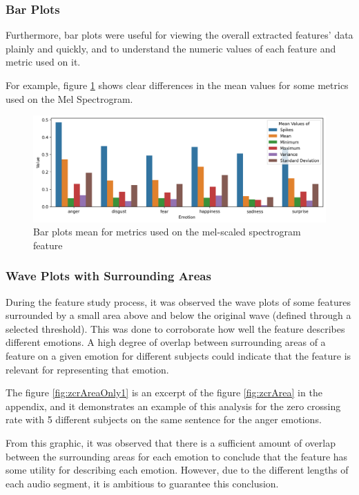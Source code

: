 \subsubsection{Bar Plots}

Furthermore, bar plots were useful for viewing the overall extracted features' data plainly and quickly, and to understand the numeric values of each feature and metric used on it.

For example, figure \ref{fig:melBarPlot} shows clear differences in the mean values for some metrics used on the Mel Spectrogram.

\begin{figure}[H]
	\centering
	\includegraphics[width=\textwidth]{figs/4_1_traditional/meanFeatBarPlot.png}
	\caption{Bar plots mean for metrics used on the mel-scaled spectrogram feature}
	\label{fig:melBarPlot}
\end{figure}


\subsubsection{Wave Plots with Surrounding Areas}

During the feature study process, it was observed the wave plots of some features surrounded by a small area above and below the original wave (defined through a selected threshold). This was done to corroborate how well the feature describes different emotions. A high degree of overlap between surrounding areas of a feature on a given emotion for different subjects could indicate that the feature is relevant for representing that emotion.

The figure \ref{fig:zcrAreaOnly1} is an excerpt of the figure \ref{fig:zcrArea} in the appendix, and it demonstrates an example of this analysis for the zero crossing rate with 5 different subjects on the same sentence for the anger emotions.

From this graphic, it was observed that there is a sufficient amount of overlap between the surrounding areas for each emotion to conclude that the feature has some utility for describing each emotion. However, due to the different lengths of each audio segment, it is ambitious to guarantee this conclusion.


